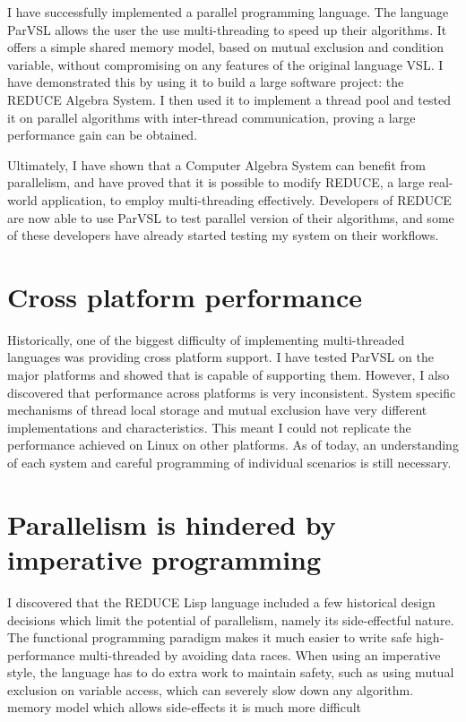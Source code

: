 I have successfully implemented a parallel programming language. The language ParVSL
allows the user the use multi-threading to speed up their algorithms. It offers
a simple shared memory model, based on mutual exclusion and condition variable,
without compromising on any features of the original language VSL. I have demonstrated
this by using it to build a large software project: the REDUCE Algebra System.
I then used it to implement a thread pool and tested it on parallel algorithms with
inter-thread communication, proving a large performance gain can be obtained.

Ultimately, I have shown that a Computer Algebra System can benefit from parallelism,
and have proved that it is possible to modify REDUCE, a large real-world application,
to employ multi-threading effectively. Developers of REDUCE are now able to
use ParVSL to test parallel version of their algorithms, and some of these developers
have already started testing my system on their workflows.

\section{Cross platform performance}

Historically, one of the biggest difficulty of implementing multi-threaded languages
was providing cross platform support. I have tested ParVSL on the major platforms and
showed that is capable of supporting them. However, I also discovered that performance
across platforms is very inconsistent. System specific mechanisms of thread local storage
and mutual exclusion have very different implementations and characteristics. This meant
I could not replicate the performance achieved on Linux on other platforms. As of today,
an understanding of each system and careful programming of individual scenarios is still
necessary.

\section{Parallelism is hindered by imperative programming}

I discovered that the REDUCE Lisp language included a few historical design decisions which
limit the potential of parallelism, namely its side-effectful nature. The functional programming
paradigm makes it much easier to write safe high-performance multi-threaded by avoiding
data races. When using an imperative style, the language has to do extra work to maintain safety,
such as using mutual exclusion on variable access, which can severely slow down any algorithm.
memory model which allows side-effects it is much more difficult

